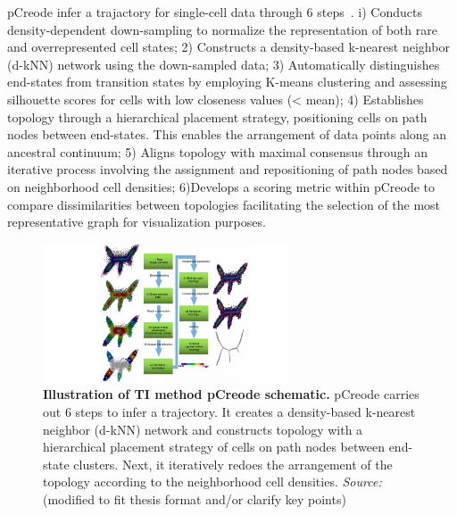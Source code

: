 \begin{description}
    pCreode infer a trajactory for single-cell data through 6 steps~\citep{herring2018pCreode}. i) Conducts density-dependent down-sampling to normalize the representation of both rare and overrepresented cell states; 2) Constructs a density-based k-nearest neighbor (d-kNN) network using the down-sampled data; 3) Automatically distinguishes end-states from transition states by employing K-means clustering and assessing silhouette scores for cells with low closeness values (< mean); 4) Establishes topology through a hierarchical placement strategy, positioning cells on path nodes between end-states. This enables the arrangement of data points along an ancestral continuum; 5) Aligns topology with maximal consensus through an iterative process involving the assignment and repositioning of path nodes based on neighborhood cell densities; 6)Develops a scoring metric within pCreode to compare dissimilarities between topologies facilitating the selection of the most representative graph for visualization purposes.
    \begin{figure}[ht!]
    	\centering
    	\includegraphics[width=0.65\textwidth]{TI_Alg_pCreode/fig}
    	\vspace{0.1cm}
    	\caption[Illustration of TI method pCreode schematic.]{\textbf{Illustration of TI method pCreode schematic.} pCreode carries out 6 steps to infer a trajectory. It creates a density-based k-nearest neighbor (d-kNN) network and constructs topology with a hierarchical placement strategy of cells on path nodes between end-state clusters. Next, it iteratively redoes the arrangement of the topology according to the neighborhood cell densities. \emph{Source:~\cite{herring2018pCreode}} (modified to fit thesis format and/or clarify key points)
    	}
    	\label{fig:TI_Alg_pCreode}
    \end{figure}


\end{description}

